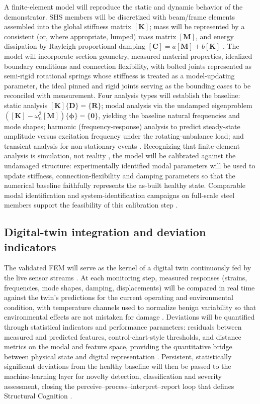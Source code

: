 A finite-element model will reproduce the static and dynamic behavior of the demonstrator. SHS members will be discretized with beam/frame elements assembled into the global stiffness matrix $[\mathbf{K}]$; mass will be represented by a consistent (or, where appropriate, lumped) mass matrix $[\mathbf{M}]$, and energy dissipation by Rayleigh proportional damping $[\mathbf{C}]=a[\mathbf{M}]+b[\mathbf{K}]$ \citep{cook2002fea}. The model will incorporate section geometry, measured material properties, idealized boundary conditions and connection flexibility, with bolted joints represented as semi-rigid rotational springs whose stiffness is treated as a model-updating parameter, the ideal pinned and rigid joints serving as the bounding cases to be reconciled with measurement. Four analysis types will establish the baseline: static analysis $[\mathbf{K}]\{\mathbf{D}\}=\{\mathbf{R}\}$; modal analysis via the undamped eigenproblem $([\mathbf{K}]-\omega_n^2[\mathbf{M}])\{\boldsymbol{\phi}\}=\{\mathbf{0}\}$, yielding the baseline natural frequencies and mode shapes; harmonic (frequency-response) analysis to predict steady-state amplitude versus excitation frequency under the rotating-unbalance load; and transient analysis for non-stationary events \citep{cook2002fea,chopra2017dynamics}. Recognizing that finite-element analysis is simulation, not reality \citep{cook2002fea}, the model will be calibrated against the undamaged structure: experimentally identified modal parameters will be used to update stiffness, connection-flexibility and damping parameters so that the numerical baseline faithfully represents the as-built healthy state. Comparable modal identification and system-identification campaigns on full-scale steel members support the feasibility of this calibration step \citep{yu2024steelbridge}.

\subsection{Digital-twin integration and deviation indicators}\label{subsec:dtintegration}

The validated FEM will serve as the kernel of a digital twin continuously fed by the live sensor streams \citep{chiachio2022structural}. At each monitoring step, measured responses (strains, frequencies, mode shapes, damping, displacements) will be compared in real time against the twin's predictions for the current operating and environmental condition, with temperature channels used to normalize benign variability so that environmental effects are not mistaken for damage \citep{farrar2013shm}. Deviations will be quantified through statistical indicators and performance parameters: residuals between measured and predicted features, control-chart-style thresholds, and distance metrics on the modal and feature space, providing the quantitative bridge between physical state and digital representation \citep{sohn2003statistical}. Persistent, statistically significant deviations from the healthy baseline will then be passed to the machine-learning layer for novelty detection, classification and severity assessment, closing the perceive--process--interpret--report loop that defines Structural Cognition \citep{zou2026deep}.

